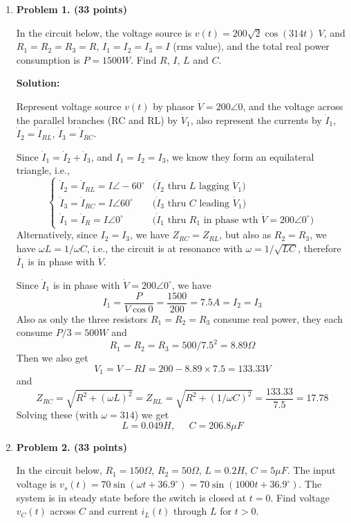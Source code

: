 \begin{enumerate}

\item {\bf Problem 1. (33 points)} 

In the circuit below, the voltage source is $v(t)=200\sqrt{2}\cos (314 t)\;V$,
and $R_1=R_2=R_3=R$, $I_1=I_2=I_3=I$ (rms value), and the total real power
consumption is $P=1500 W$. Find $R$, $I$, $L$ and $C$.


{\bf Solution:}

Represent voltage source $v(t)$ by phasor $\dot{V}=200\angle 0$, and the voltage 
across the parallel branches (RC and RL) by $\dot{V}_1$, also represent the currents
by $\dot{I}_1$, $\dot{I}_2=\dot{I}_{RL}$, $\dot{I}_3=\dot{I}_{RC}$. 

Since $\dot{I}_1=\dot{I}_2+\dot{I}_3$, and $I_1=I_2=I_3$, we know they form an 
equilateral triangle, i.e., 
\[ \left\{ \begin{array}{ll}
    \dot{I}_2=\dot{I}_{RL}=I \angle -60^\circ & \mbox{($\dot{I}_2$ thru $L$ lagging $\dot{V}_1$)}\\
    \dot{I}_3=\dot{I}_{RC}=I \angle  60^\circ & \mbox{($\dot{I}_3$ thru $C$ leading $\dot{V}_1$)}\\
    \dot{I}_1=\dot{I}_R=I \angle 0^\circ & \mbox{($\dot{I}_1$ thru $R_1$ in phase wth $\dot{V}=200\angle 0^\circ $)}
    \end{array} \right. \]
Alternatively, since $I_2=I_3$, we have $Z_{RC}=Z_{RL}$, but also as
$R_2=R_3$, we have $\omega L=1/\omega C$, i.e., the circuit is at resonance with 
$\omega=1/\sqrt{LC}$, therefore $\dot{I_1}$ is in phase with $\dot{V}$. 

Since $\dot{I}_1$ is in phase with $\dot{V}=200\angle 0^\circ$, we have
\[ I_1=\frac{P}{V \cos 0}=\frac{1500}{200}=7.5A =I_2=I_3 \]
Also as only the three resistors $R_1=R_2=R_3$ consume real power, they each consume 
$P/3=500W$ and 
\[ R_1=R_2=R_3=500/7.5^2=8.89\Omega \]
Then we also get
\[ V_1=V-RI=200-8.89\times 7.5=133.33 V \]
and
\[ Z_{RC}=\sqrt{R^2+(\omega L)^2}=Z_{RL}=\sqrt{R^2+(1/\omega C)^2}=\frac{133.33}{7.5}=17.78 \]
Solving these (with $\omega=314$) we get
\[ L=0.049H, \;\;\;\;\;C=206.8\mu F \]

\item {\bf Problem 2. (33 points)} 

In the circuit below, $R_1=150\Omega$, $R_2=50\Omega$, $L=0.2H$, $C=5\mu F$.
The input voltage is $v_s(t)=70\sin(\omega t+36.9^\circ)=70\sin(1000 t+36.9^\circ)$.
The system is in steady state before the switch is closed at $t=0$. Find voltage 
$v_C(t)$ across $C$ and current $i_L(t)$ through $L$ for $t>0$.


\end{enumerate}
